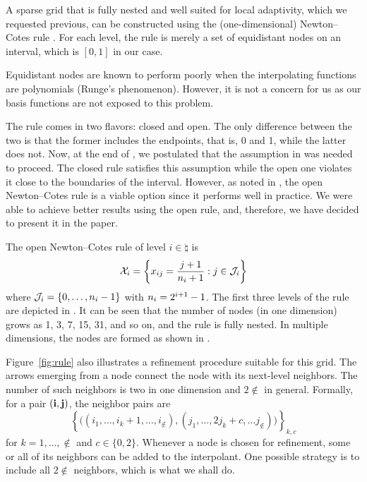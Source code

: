 A sparse grid that is fully nested and well suited for local adaptivity, which
we requested previous, can be constructed using the (one-dimensional)
Newton--Cotes rule \cite{klimke2006, ma2009}. For each level, the rule is merely
a set of equidistant nodes on an interval, which is $[0, 1]$ in our case.

\begin{remark}
Equidistant nodes are known to perform poorly when the interpolating functions
are polynomials (Runge's phenomenon). However, it is not a concern for us as our
basis functions are not exposed to this problem.
\end{remark}

The rule comes in two flavors: closed and open. The only difference between the
two is that the former includes the endpoints, that is, 0 and 1, while the
latter does not. Now, at the end of , we postulated that
the assumption in  was needed to proceed. The closed rule
satisfies this assumption while the open one violates it close to the boundaries
of the interval. However, as noted in \cite{klimke2006}, the open Newton--Cotes
rule is a viable option since it performs well in practice. We were able to
achieve better results using the open rule, and, therefore, we have decided to
present it in the paper.


The open Newton--Cotes rule of level $i \in \natural$ is
\begin{equation} \elab{newton-cotes-grid}
  \X_i = \left\{ x_{ij} = \frac{j + 1}{\n_i + 1}: j \in \index_i \right\}
\end{equation}
where $\mathcal{J}_i = \left\{ 0, \dots, n_i - 1 \right\}$ with $n_i = 2^{i + 1} -
1$. The first three levels of the rule are depicted in . It can be
seen that the number of nodes (in one dimension) grows as 1, 3, 7, 15, 31, and
so on, and the rule is fully nested. In multiple dimensions, the nodes are
formed as shown in .

Figure~\ref{fig:rule} also illustrates a refinement procedure suitable for this
grid. The arrows emerging from a node connect the node with its next-level
neighbors. The number of such neighbors is two in one dimension and $2 \nin$ in
general. Formally, for a pair $(\mathbf{i}, \mathbf{j})$, the neighbor pairs are
\[
  \left\{ \Big( (i_1, \dots, i_k + 1, \dots, i_\nin), (j_1, \dots, 2 j_k + c, \dots j_\nin) \Big) \right\}_{k, c}
\]
for $k = 1, \dots, \nin$ and $c \in \{ 0, 2 \}$. Whenever a node is chosen for
refinement, some or all of its neighbors can be added to the interpolant. One
possible strategy is to include all $2 \nin$ neighbors, which is what we shall
do.

